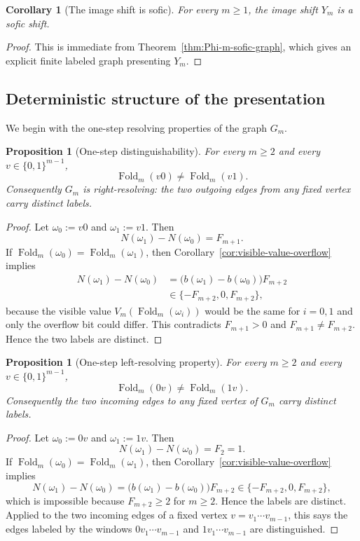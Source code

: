 \documentclass[11pt,letterpaper]{article}
\numberwithin{equation}{section}
\theoremstyle{plain}
\newtheorem{proposition}[theorem]{Proposition}
\newtheorem{corollary}[theorem]{Corollary}
\theoremstyle{definition}
\theoremstyle{remark}
\DeclareMathOperator{\Fold}{Fold}
\begin{document}
\begin{corollary}[The image shift is sofic]
\label{prop:Y-m-sofic}
For every $m\ge 1$, the image shift $Y_m$ is a sofic shift.
\end{corollary}

\begin{proof}
This is immediate from Theorem~\ref{thm:Phi-m-sofic-graph}, which gives an
explicit finite labeled graph presenting $Y_m$.
\end{proof}

\subsection{Deterministic structure of the presentation}

We begin with the one-step resolving properties of the graph $G_m$.

\begin{proposition}[One-step distinguishability]
\label{prop:one-step-right-resolving}
For every $m\ge 2$ and every $v\in\{0,1\}^{m-1}$,
\[
\Fold_m(v0)\neq \Fold_m(v1).
\]
Consequently $G_m$ is right-resolving: the two outgoing edges from any fixed
vertex carry distinct labels.
\end{proposition}

\begin{proof}
Let $\omega_0:=v0$ and $\omega_1:=v1$.  Then
\[
N(\omega_1)-N(\omega_0)=F_{m+1}.
\]
If $\Fold_m(\omega_0)=\Fold_m(\omega_1)$, then
Corollary~\ref{cor:visible-value-overflow} implies
\[
\begin{aligned}
N(\omega_1)-N(\omega_0)
&=
\bigl(b(\omega_1)-b(\omega_0)\bigr)F_{m+2}\\
&\in\{-F_{m+2},0,F_{m+2}\},
\end{aligned}
\]
because the visible value $V_m(\Fold_m(\omega_i))$ would be the same for
$i=0,1$ and only the overflow bit could differ.  This contradicts
$F_{m+1}>0$ and $F_{m+1}\neq F_{m+2}$.  Hence the two labels are distinct.
\end{proof}

\begin{proposition}[One-step left-resolving property]
\label{prop:one-step-left-resolving}
For every $m\ge 2$ and every $v\in\{0,1\}^{m-1}$,
\[
\Fold_m(0v)\neq \Fold_m(1v).
\]
Consequently the two incoming edges to any fixed vertex of $G_m$ carry
distinct labels.
\end{proposition}

\begin{proof}
Let $\omega_0:=0v$ and $\omega_1:=1v$.  Then
\[
N(\omega_1)-N(\omega_0)=F_2=1.
\]
If $\Fold_m(\omega_0)=\Fold_m(\omega_1)$, then
Corollary~\ref{cor:visible-value-overflow} implies
\[
N(\omega_1)-N(\omega_0)
=
\bigl(b(\omega_1)-b(\omega_0)\bigr)F_{m+2}
\in\{-F_{m+2},0,F_{m+2}\},
\]
which is impossible because $F_{m+2}\ge 2$ for $m\ge 2$.  Hence the labels are
distinct.  Applied to the two incoming edges of a fixed vertex
$v=v_1\cdots v_{m-1}$, this says the edges labeled by the windows
$0v_1\cdots v_{m-1}$ and $1v_1\cdots v_{m-1}$ are distinguished.
\end{proof}
\end{document}
